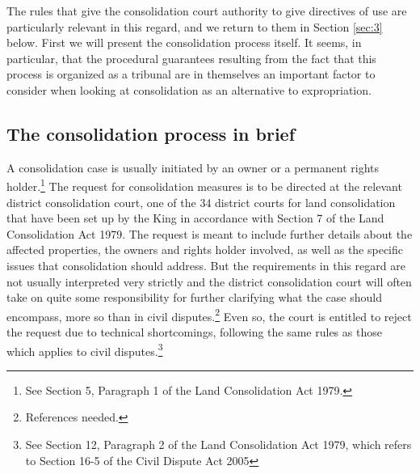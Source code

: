 The rules that give the consolidation court authority to give directives of use are particularly relevant in this regard, and we return to them in Section \ref{sec:3} below. First we will present the consolidation process itself. It seems, in particular, that the procedural guarantees resulting from the fact that this process is organized as a tribunal are in themselves an important factor to consider when looking at consolidation as an alternative to expropriation.

\subsection{The consolidation process in brief}\label{subsec:21}

A consolidation case is usually initiated by an owner or a permanent rights holder.\footnote{See Section 5, Paragraph 1 of the Land Consolidation Act 1979.} The request for consolidation measures is to be directed at the relevant district consolidation court, one of the 34 district courts for land consolidation that have been set up by the King in accordance with Section 7 of the Land Consolidation Act 1979. The request is meant to include further details about the affected properties, the owners and rights holder involved, as well as the specific issues that consolidation should address. But the requirements in this regard are not usually interpreted very strictly and the district consolidation court will often take on quite some responsibility for further clarifying what the case should encompass, more so than in civil disputes.\footnote{References needed.} Even so, the court is entitled to reject the request due to technical shortcomings, following the same rules as those which applies to civil disputes.\footnote{See Section 12, Paragraph 2 of the Land Consolidation Act 1979, which refers to Section 16-5 of the Civil Dispute Act 2005}

